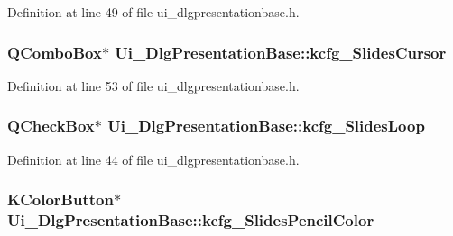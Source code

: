Definition at line 49 of file ui\+\_\+dlgpresentationbase.\+h.

\hypertarget{classUi__DlgPresentationBase_a63fb3704d0688c48101de850dc997a52}{
\subsubsection[{kcfg\+\_\+\+Slides\+Cursor}]{\setlength{\rightskip}{0pt plus 5cm}Q\+Combo\+Box$\ast$ Ui\+\_\+\+Dlg\+Presentation\+Base\+::kcfg\+\_\+\+Slides\+Cursor}}\label{classUi__DlgPresentationBase_a63fb3704d0688c48101de850dc997a52}


Definition at line 53 of file ui\+\_\+dlgpresentationbase.\+h.

\hypertarget{classUi__DlgPresentationBase_a4bce7ac09466e7c37491950385741fa5}{
\subsubsection[{kcfg\+\_\+\+Slides\+Loop}]{\setlength{\rightskip}{0pt plus 5cm}Q\+Check\+Box$\ast$ Ui\+\_\+\+Dlg\+Presentation\+Base\+::kcfg\+\_\+\+Slides\+Loop}}\label{classUi__DlgPresentationBase_a4bce7ac09466e7c37491950385741fa5}


Definition at line 44 of file ui\+\_\+dlgpresentationbase.\+h.

\hypertarget{classUi__DlgPresentationBase_a7ee75f80ae8dc535a43d18fe930aa27b}{
\subsubsection[{kcfg\+\_\+\+Slides\+Pencil\+Color}]{\setlength{\rightskip}{0pt plus 5cm}K\+Color\+Button$\ast$ Ui\+\_\+\+Dlg\+Presentation\+Base\+::kcfg\+\_\+\+Slides\+Pencil\+Color}}\label{classUi__DlgPresentationBase_a7ee75f80ae8dc535a43d18fe930aa27b}


